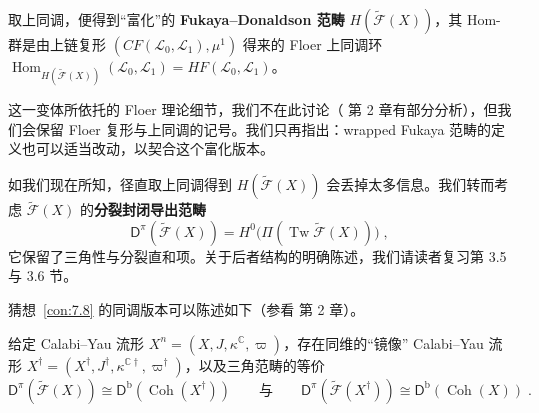 取上同调，便得到“富化”的 \textbf{Fukaya–Donaldson 范畴} $H(\widetilde{\mathcal F}(X))$，其 Hom-群是由上链复形 $(CF(\mathcal L_0,\mathcal L_1),\mu^1)$ 得来的 Floer 上同调环 $\operatorname{Hom}_{H(\widetilde{\mathcal F}(X))}(\mathcal L_0,\mathcal L_1)=HF(\mathcal L_0,\mathcal L_1)$。

这一变体所依托的 Floer 理论细节，我们不在此讨论（\cite{Fuk02a} 第 2 章有部分分析），但我们会保留 Floer 复形与上同调的记号。我们只再指出：wrapped Fukaya 范畴的定义也可以适当改动，以契合这个富化版本。

如我们现在所知，径直取上同调得到 $H(\widetilde{\mathcal F}(X))$ 会丢掉太多信息。我们转而考虑 $\widetilde{\mathcal F}(X)$ 的\textbf{分裂封闭导出范畴}
\[
\mathsf D^\pi(\widetilde{\mathcal F}(X))=H^0\bigl(\Pi(\operatorname{Tw}\widetilde{\mathcal F}(X))\bigr)\;,
\]
它保留了三角性与分裂直和项。关于后者结构的明确陈述，我们请读者复习第 3.5 与 3.6 节。

猜想~\ref{con:7.8} 的同调版本可以陈述如下（参看 \cite{Fuk02a} 第 2 章）。

\begin{Con}[同调镜像对称猜想]\label{con:7.26}
给定 Calabi–Yau 流形 $X^n=(X,J,\kappa^{\mathbb C},\varpi)$，存在同维的“镜像” Calabi–Yau 流形 $X^\dagger=(X^\dagger,J^\dagger,\kappa^{\mathbb C\dagger},\varpi^\dagger)$，以及三角范畴的等价
\begin{equation}\label{eq:7.114}
\mathsf D^\pi(\widetilde{\mathcal F}(X))\cong\mathsf D^{\mathrm b}(\operatorname{Coh}(X^\dagger))
\qquad\text{与}\qquad
\mathsf D^\pi(\widetilde{\mathcal F}(X^\dagger))\cong\mathsf D^{\mathrm b}(\operatorname{Coh}(X))\;.
\end{equation}
\end{Con}

